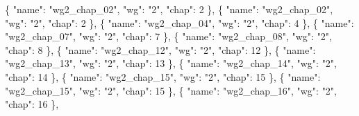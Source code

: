 \documentclass[
]{article}
\newenvironment{Shaded}{}{}
\newcommand{\DataTypeTok}[1]{\textcolor[rgb]{0.56,0.13,0.00}{#1}}
\newcommand{\DecValTok}[1]{\textcolor[rgb]{0.25,0.63,0.44}{#1}}
\newcommand{\FunctionTok}[1]{\textcolor[rgb]{0.02,0.16,0.49}{#1}}
\newcommand{\OtherTok}[1]{\textcolor[rgb]{0.00,0.44,0.13}{#1}}
\newcommand{\StringTok}[1]{\textcolor[rgb]{0.25,0.44,0.63}{#1}}
\begin{document}
\begin{Shaded}
\begin{Highlighting}[]
    \FunctionTok{\{} \DataTypeTok{"name"}\FunctionTok{:} \StringTok{"wg2\_chap\_02"}\FunctionTok{,} \DataTypeTok{"wg"}\FunctionTok{:} \StringTok{"2"}\FunctionTok{,} \DataTypeTok{"chap"}\FunctionTok{:} \DecValTok{2} \FunctionTok{\}}\OtherTok{,}
    \FunctionTok{\{} \DataTypeTok{"name"}\FunctionTok{:} \StringTok{"wg2\_chap\_02"}\FunctionTok{,} \DataTypeTok{"wg"}\FunctionTok{:} \StringTok{"2"}\FunctionTok{,} \DataTypeTok{"chap"}\FunctionTok{:} \DecValTok{2} \FunctionTok{\}}\OtherTok{,}
    \FunctionTok{\{} \DataTypeTok{"name"}\FunctionTok{:} \StringTok{"wg2\_chap\_04"}\FunctionTok{,} \DataTypeTok{"wg"}\FunctionTok{:} \StringTok{"2"}\FunctionTok{,} \DataTypeTok{"chap"}\FunctionTok{:} \DecValTok{4} \FunctionTok{\}}\OtherTok{,}
    \FunctionTok{\{} \DataTypeTok{"name"}\FunctionTok{:} \StringTok{"wg2\_chap\_07"}\FunctionTok{,} \DataTypeTok{"wg"}\FunctionTok{:} \StringTok{"2"}\FunctionTok{,} \DataTypeTok{"chap"}\FunctionTok{:} \DecValTok{7} \FunctionTok{\}}\OtherTok{,}
    \FunctionTok{\{} \DataTypeTok{"name"}\FunctionTok{:} \StringTok{"wg2\_chap\_08"}\FunctionTok{,} \DataTypeTok{"wg"}\FunctionTok{:} \StringTok{"2"}\FunctionTok{,} \DataTypeTok{"chap"}\FunctionTok{:} \DecValTok{8} \FunctionTok{\}}\OtherTok{,}
    \FunctionTok{\{} \DataTypeTok{"name"}\FunctionTok{:} \StringTok{"wg2\_chap\_12"}\FunctionTok{,} \DataTypeTok{"wg"}\FunctionTok{:} \StringTok{"2"}\FunctionTok{,} \DataTypeTok{"chap"}\FunctionTok{:} \DecValTok{12} \FunctionTok{\}}\OtherTok{,}
    \FunctionTok{\{} \DataTypeTok{"name"}\FunctionTok{:} \StringTok{"wg2\_chap\_13"}\FunctionTok{,} \DataTypeTok{"wg"}\FunctionTok{:} \StringTok{"2"}\FunctionTok{,} \DataTypeTok{"chap"}\FunctionTok{:} \DecValTok{13} \FunctionTok{\}}\OtherTok{,}
    \FunctionTok{\{} \DataTypeTok{"name"}\FunctionTok{:} \StringTok{"wg2\_chap\_14"}\FunctionTok{,} \DataTypeTok{"wg"}\FunctionTok{:} \StringTok{"2"}\FunctionTok{,} \DataTypeTok{"chap"}\FunctionTok{:} \DecValTok{14} \FunctionTok{\}}\OtherTok{,}
    \FunctionTok{\{} \DataTypeTok{"name"}\FunctionTok{:} \StringTok{"wg2\_chap\_15"}\FunctionTok{,} \DataTypeTok{"wg"}\FunctionTok{:} \StringTok{"2"}\FunctionTok{,} \DataTypeTok{"chap"}\FunctionTok{:} \DecValTok{15} \FunctionTok{\}}\OtherTok{,}
    \FunctionTok{\{} \DataTypeTok{"name"}\FunctionTok{:} \StringTok{"wg2\_chap\_15"}\FunctionTok{,} \DataTypeTok{"wg"}\FunctionTok{:} \StringTok{"2"}\FunctionTok{,} \DataTypeTok{"chap"}\FunctionTok{:} \DecValTok{15} \FunctionTok{\}}\OtherTok{,}
    \FunctionTok{\{} \DataTypeTok{"name"}\FunctionTok{:} \StringTok{"wg2\_chap\_16"}\FunctionTok{,} \DataTypeTok{"wg"}\FunctionTok{:} \StringTok{"2"}\FunctionTok{,} \DataTypeTok{"chap"}\FunctionTok{:} \DecValTok{16} \FunctionTok{\}}\OtherTok{,}

\end{Highlighting}
\end{Shaded}
\end{document}
